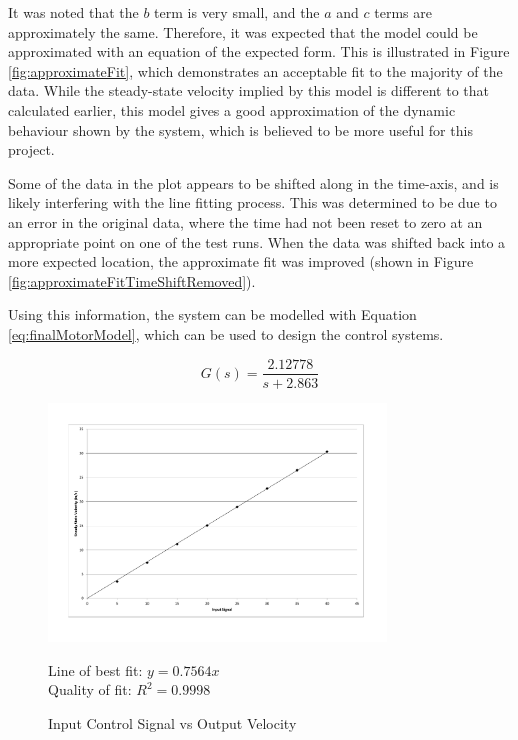 \documentclass[10pt]{article}
\begin{document}
It was noted that the $b$ term is very small, and the $a$ and $c$ terms are
approximately the same.  Therefore, it was expected that the model could be
approximated with an equation of the expected form.  This is illustrated in
Figure \ref{fig:approximateFit}, which demonstrates an acceptable fit to the
majority of the data.  While the steady-state velocity implied by this model is
different to that calculated earlier, this model gives a good approximation of
the dynamic behaviour shown by the system, which is believed to be more useful
for this project.

Some of the data in the plot appears to be shifted along in the time-axis, and
is likely interfering with the line fitting process. This was determined to be
due to an error in the original data, where the time had not been reset to zero
at an appropriate point on one of the test runs. When the data was shifted back
into a more expected location, the approximate fit was improved (shown in Figure
\ref{fig:approximateFitTimeShiftRemoved}).

Using this information, the system can be modelled with Equation
\ref{eq:finalMotorModel}, which can be used to design the control systems.

\begin{equation}
 \label{eq:finalMotorModel}
 G\left(s\right) = \frac{2.12778}{s+2.863}
\end{equation}

\begin{figure}
 \centering
 \includegraphics[width=0.8\textwidth]{Images/input-signal-vs-output-speed}
 \caption{Input Control Signal vs Output Velocity}
 \label{fig:inputOutputVelocityGraph}

 Line of best fit: $y=0.7564x$ \\
 Quality of fit: $R^2 = 0.9998$
\end{figure}
\end{document}
